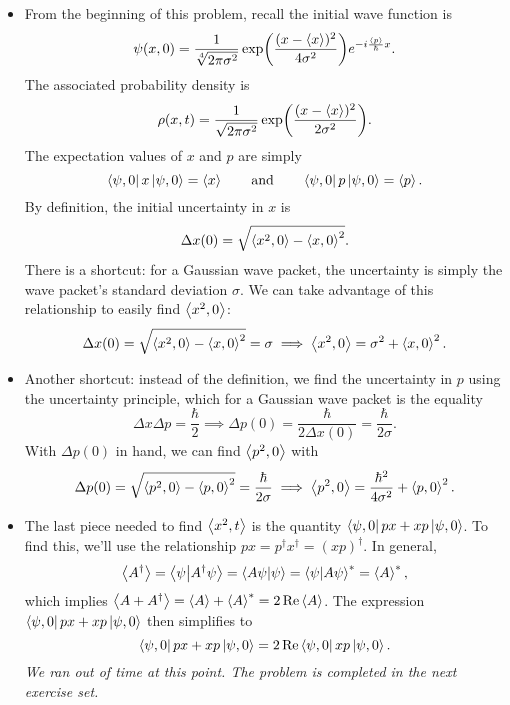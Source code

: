\documentclass[11pt, a4paper]{article}
\newcommand{\eqtext}[1]{\qquad \text{#1} \qquad}
\newcommand{\evb}[1]{\big \langle {#1} \big \rangle}  %
\newcommand{\bbraket}[2]{\big \langle {#1} \big | {#2} \big \rangle}  %
\begin{document}
\begin{itemize}
	\item From the beginning of this problem, recall the initial wave function is
	\begin{equation*}
		\psi(x, 0) = \frac{1}{\sqrt[4]{2\pi \sigma^{2}}} \exp(\frac{(x - \ev{x})^{2}}{4 \sigma^{2}})e^{-i\frac{\ev{p}}{\hbar}x}.
	\end{equation*}
	The associated probability density is 
	\begin{equation*}
		\rho(x, t) = \frac{1}{\sqrt{2\pi \sigma^{2}}} \exp(\frac{(x - \ev{x})^{2}}{2 \sigma^{2}}).
	\end{equation*}
	The expectation values of $ x $ and $ p $ are simply
	\begin{equation*}
		\bra{\psi, 0} x \ket{\psi, 0} = \ev{x} \eqtext{and} \bra{\psi, 0} p \ket{\psi, 0} = \ev{p}.
	\end{equation*}
	By definition, the initial uncertainty in $ x $ is
	\begin{equation*}
		\Delta x(0) = \sqrt{\ev{x^{2}, 0} - \ev{x, 0}^{2}}.
	\end{equation*}
	There is a shortcut: for a Gaussian wave packet, the uncertainty is simply the wave packet's standard deviation $ \sigma $. We can take advantage of this relationship to easily find $ \ev{x^{2}, 0} $:
	\begin{equation*}
		\Delta x(0) = \sqrt{\ev{x^{2}, 0} - \ev{x, 0}^{2}} = \sigma \implies \ev{x^{2}, 0} = \sigma^{2} + \ev{x, 0}^{2}.
	\end{equation*}
	
	\item Another shortcut: instead of the definition, we find the uncertainty in $ p $ using the uncertainty principle, which for a Gaussian wave packet is the equality
	\begin{equation*}
		\Delta x \Delta p = \frac{\hbar}{2} \implies \Delta p(0) = \frac{\hbar}{2\Delta x(0)} = \frac{\hbar}{2\sigma}.
	\end{equation*}
	With $ \Delta p(0) $ in hand, we can find $ \ev{p^{2}, 0} $ with
	\begin{equation*}
		\Delta p(0) = \sqrt{\ev{p^{2}, 0} - \ev{p, 0}^{2}} = \frac{\hbar}{2\sigma} \implies \ev{p^{2}, 0} = \frac{\hbar^{2}}{4\sigma^{2}} + \ev{p, 0}^{2}.
	\end{equation*}
	
	\item The last piece needed to find $ \ev{x^{2}, t} $ is the quantity $ \bra{\psi, 0} px + xp \ket{\psi, 0}  $. To find this, we'll use the relationship $ px = p^{\dagger}x^{\dagger} = (xp)^{\dagger} $. In general,
	\begin{equation*}
		\evb{A^{\dagger}} = \bbraket{\psi}{A^{\dagger}\psi} = \braket{A\psi}{\psi} = \braket{\psi}{A\psi}^{*} = \ev{A}^{*},
	\end{equation*}
	which implies $ \ev{A + A^{\dagger}} = \ev{A} + \ev{A}^{*} = 2 \Re \ev{A} $. The expression $  \bra{\psi, 0} px + xp \ket{\psi, 0}  $ then simplifies to
	\begin{equation*}
		 \bra{\psi, 0} px + xp \ket{\psi, 0}  = 2 \Re \bra{\psi, 0}xp \ket{\psi, 0}.
	\end{equation*}
	\textit{We ran out of time at this point. The problem is completed in the next exercise set.}
	

\end{itemize}
\end{document}
